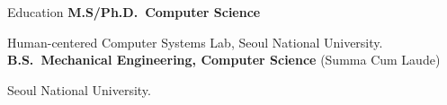 \begin{rubric}{Education}
\entry*[2023 -- ]%
	\textbf{M.S/Ph.D.~Computer Science}\par
	Human-centered Computer Systems Lab, Seoul National University.
% 
\entry*[2017 -- 2023]%
	\textbf{B.S.~Mechanical Engineering, Computer Science} (Summa Cum Laude)\par
	Seoul National University.
\end{rubric}